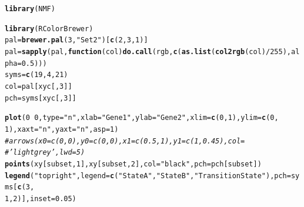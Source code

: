 \documentclass{article}\usepackage[]{graphicx}\usepackage[]{color}
\makeatletter
\newcommand{\hlnum}[1]{\textcolor[rgb]{0.686,0.059,0.569}{#1}}%
\newcommand{\hlstr}[1]{\textcolor[rgb]{0.192,0.494,0.8}{#1}}%
\newcommand{\hlcom}[1]{\textcolor[rgb]{0.678,0.584,0.686}{\textit{#1}}}%
\newcommand{\hlopt}[1]{\textcolor[rgb]{0,0,0}{#1}}%
\newcommand{\hlstd}[1]{\textcolor[rgb]{0.345,0.345,0.345}{#1}}%
\newcommand{\hlkwa}[1]{\textcolor[rgb]{0.161,0.373,0.58}{\textbf{#1}}}%
\newcommand{\hlkwb}[1]{\textcolor[rgb]{0.69,0.353,0.396}{#1}}%
\newcommand{\hlkwc}[1]{\textcolor[rgb]{0.333,0.667,0.333}{#1}}%
\newcommand{\hlkwd}[1]{\textcolor[rgb]{0.737,0.353,0.396}{\textbf{#1}}}%
\newenvironment{kframe}{%
 \def\at@end@of@kframe{}%
 \ifinner\ifhmode%
  \def\at@end@of@kframe{\end{minipage}}%
  \begin{minipage}{\columnwidth}%
 \fi\fi%
 \def\FrameCommand##1{\hskip\@totalleftmargin \hskip-\fboxsep
 \colorbox{shadecolor}{##1}\hskip-\fboxsep
     \hskip-\linewidth \hskip-\@totalleftmargin \hskip\columnwidth}%
 \MakeFramed {\advance\hsize-\width
   \@totalleftmargin\z@ \linewidth\hsize
   \@setminipage}}%
 {\par\unskip\endMakeFramed%
 \at@end@of@kframe}
\newenvironment{knitrout}{}{} %
\makeatother
\begin{document}
\begin{knitrout}
\color{fgcolor}\begin{kframe}
\begin{alltt}
\hlkwd{library}\hlstd{(NMF)}
\end{alltt}


{\ttfamily\noindent\itshape\color{messagecolor}{\#\# Loading required package: methods\\\#\# Loading required package: pkgmaker\\\#\# Loading required package: registry\\\#\# Loading required package: rngtools\\\#\# Loading required package: cluster\\\#\# NMF - BioConductor layer [OK] | Shared memory capabilities [OK] | Cores 7/8}}\begin{alltt}
\hlkwd{library}\hlstd{(RColorBrewer)}
\hlstd{pal} \hlkwb{=} \hlkwd{brewer.pal}\hlstd{(}\hlnum{3}\hlstd{,} \hlstr{"Set2"}\hlstd{)[}\hlkwd{c}\hlstd{(}\hlnum{2}\hlstd{,} \hlnum{3}\hlstd{,} \hlnum{1}\hlstd{)]}
\hlstd{pal} \hlkwb{=} \hlkwd{sapply}\hlstd{(pal,} \hlkwa{function}\hlstd{(}\hlkwc{col}\hlstd{)} \hlkwd{do.call}\hlstd{(rgb,} \hlkwd{c}\hlstd{(}\hlkwd{as.list}\hlstd{(}\hlkwd{col2rgb}\hlstd{(col)}\hlopt{/}\hlnum{255}\hlstd{),} \hlkwc{alpha} \hlstd{=} \hlnum{0.5}\hlstd{)))}
\hlstd{syms} \hlkwb{=} \hlkwd{c}\hlstd{(}\hlnum{19}\hlstd{,} \hlnum{4}\hlstd{,} \hlnum{21}\hlstd{)}
\hlstd{col} \hlkwb{=} \hlstd{pal[xyc[,} \hlnum{3}\hlstd{]]}
\hlstd{pch} \hlkwb{=} \hlstd{syms[xyc[,} \hlnum{3}\hlstd{]]}

\hlkwd{plot}\hlstd{(}\hlnum{0} \hlopt{~} \hlnum{0}\hlstd{,} \hlkwc{type} \hlstd{=} \hlstr{"n"}\hlstd{,} \hlkwc{xlab} \hlstd{=} \hlstr{"Gene 1"}\hlstd{,} \hlkwc{ylab} \hlstd{=} \hlstr{"Gene 2"}\hlstd{,} \hlkwc{xlim} \hlstd{=} \hlkwd{c}\hlstd{(}\hlnum{0}\hlstd{,} \hlnum{1}\hlstd{),} \hlkwc{ylim} \hlstd{=} \hlkwd{c}\hlstd{(}\hlnum{0}\hlstd{,}
    \hlnum{1}\hlstd{),} \hlkwc{xaxt} \hlstd{=} \hlstr{"n"}\hlstd{,} \hlkwc{yaxt} \hlstd{=} \hlstr{"n"}\hlstd{,} \hlkwc{asp} \hlstd{=} \hlnum{1}\hlstd{)}
\hlcom{# arrows( x0 = c(0, 0), y0 = c(0, 0), x1 = c(0.5, 1), y1 = c(1, 0.45), col =}
\hlcom{# 'lightgrey', lwd = 5)}
\hlkwd{points}\hlstd{(xy[subset,} \hlnum{1}\hlstd{], xy[subset,} \hlnum{2}\hlstd{],} \hlkwc{col} \hlstd{=} \hlstr{"black"}\hlstd{,} \hlkwc{pch} \hlstd{= pch[subset])}
\hlkwd{legend}\hlstd{(}\hlstr{"topright"}\hlstd{,} \hlkwc{legend} \hlstd{=} \hlkwd{c}\hlstd{(}\hlstr{"State A"}\hlstd{,} \hlstr{"State B"}\hlstd{,} \hlstr{"Transition State"}\hlstd{),} \hlkwc{pch} \hlstd{= syms[}\hlkwd{c}\hlstd{(}\hlnum{3}\hlstd{,}
    \hlnum{1}\hlstd{,} \hlnum{2}\hlstd{)],} \hlkwc{inset} \hlstd{=} \hlnum{0.05}\hlstd{)}
\end{alltt}
\end{kframe}


\end{knitrout}
\end{document}
